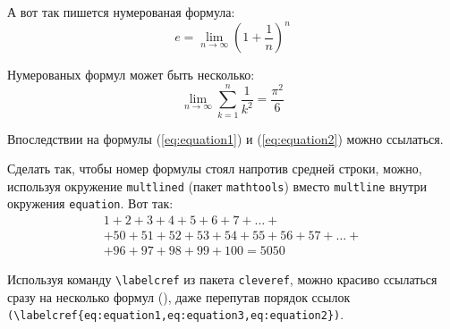 А вот так пишется нумерованая формула:
\begin{equation}
  \label{eq:equation1}
  e = \lim_{n \to \infty} \left( 1+\frac{1}{n} \right) ^n
\end{equation}

Нумерованых формул может быть несколько:
\begin{equation}
  \label{eq:equation2}
  \lim_{n \to \infty} \sum_{k=1}^n \frac{1}{k^2} = \frac{\pi^2}{6}
\end{equation}

Впоследствии на формулы (\ref{eq:equation1}) и (\ref{eq:equation2}) можно ссылаться.

Сделать так, чтобы номер формулы стоял напротив средней строки, можно, используя окружение \verb|multlined| (пакет \verb|mathtools|) вместо \verb|multline| внутри окружения \verb|equation|. Вот так:
\begin{equation} %
  \label{eq:equation3}
    \begin{multlined}
        1+ 2+3+4+5+6+7+\dots + \\
        + 50+51+52+53+54+55+56+57 + \dots + \\
        + 96+97+98+99+100=5050
    \end{multlined}
\end{equation}

Используя команду \verb|\labelcref| из пакета \verb|cleveref|, можно
красиво ссылаться сразу на несколько формул
(), даже перепутав
порядок ссылок \verb|(\labelcref{eq:equation1,eq:equation3,eq:equation2})|.

